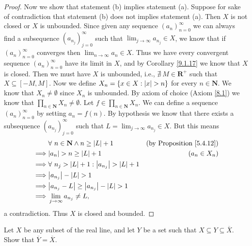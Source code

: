 \begin{proof}
    Now we show that statement (b) implies statement (a).
    Suppose for sake of contradiction that statement (b) does not implies statement (a).
    Then \(X\) is not closed or \(X\) is unbounded.
    Since given any sequence \((a_n)_{n = 0}^\infty\) we can always find a subsequence \((a_{n_j})_{j = 0}^\infty\) such that \(\lim_{j \to \infty} a_{n_j} \in X\), we know that if \((a_n)_{n = 0}^\infty\) converges then \(\lim_{n \to \infty} a_n \in X\).
    Thus we have every convergent sequence \((a_n)_{n = 0}^\infty\) have its limit in \(X\), and by Corollary \ref{9.1.17} we know that \(X\) is closed.
    Then we must have \(X\) is unbounded, i.e., \(\nexists\ M \in \mathbf{R}^+\) such that \(X \subseteq [-M, M]\).
    Now we define \(X_n = \{x \in X : \abs*{x} > n\}\) for every \(n \in \mathbf{N}\).
    We know that \(X_n \neq \emptyset\) since \(X_n\) is unbounded.
    By axiom of choice (Axiom \ref{8.1}) we know that \(\prod_{n \in \mathbf{N}} X_n \neq \emptyset\).
    Let \(f \in \prod_{n \in \mathbf{N}} X_n\).
    We can define a sequence \((a_n)_{n = 0}^\infty\) by setting \(a_n = f(n)\).
    By hypothesis we know that there exists a subsequence \((a_{n_j})_{j = 0}^\infty\) such that \(L = \lim_{j \to \infty} a_{n_j} \in X\).
    But this means
    \begin{align*}
                 & \forall\ n \in \mathbf{N} \land n \geq \abs*{L} + 1         & \text{(by Proposition \ref{5.4.12})} \\
        \implies & \abs*{a_n} > n \geq \abs*{L} + 1                            & (a_n \in X_n)                        \\
        \implies & \forall\ n_j > \abs*{L} + 1 : \abs*{a_{n_j}} > \abs*{L} + 1                                        \\
        \implies & \abs*{a_{n_j}} - \abs*{L} > 1                                                                      \\
        \implies & \abs*{a_{n_j} - L} \geq \abs*{a_{n_j}} - \abs*{L} > 1                                              \\
        \implies & \lim_{j \to \infty} a_{n_j} \neq L,
    \end{align*}
    a contradiction.
    Thus \(X\) is closed and bounded.
\end{proof}

\exercisesection

\begin{exercise}\label{ex 9.1.1}
    Let \(X\) be any subset of the real line, and let \(Y\) be a set such that \(X \subseteq Y \subseteq \overline{X}\).
    Show that \(\overline{Y} = \overline{X}\).
\end{exercise}

